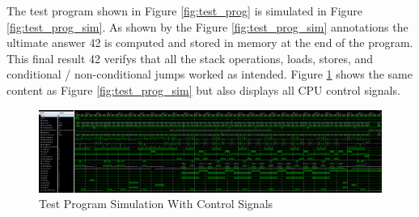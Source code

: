 \documentclass{article}
\begin{document}
\begin{par}
	\newpage

	The test program shown in Figure \ref{fig:test_prog} is simulated in Figure \ref{fig:test_prog_sim}. As shown by the Figure \ref{fig:test_prog_sim} annotations the ultimate answer 42 is computed and stored in memory at the end of the program. This final result 42 verifys that all the stack operations, loads, stores, and conditional / non-conditional jumps worked as intended. Figure \ref{fig:test_prog_sim2} shows the same content as Figure \ref{fig:test_prog_sim} but also displays all CPU control signals. 
	
	\begin{figure}[H]
		\centering
		\includegraphics[width=7in]{img/test_prog2.png}
		\caption{ Test Program Simulation With Control Signals }
		\label{fig:test_prog_sim2}
	\end{figure}

\end{par}
\end{document}
